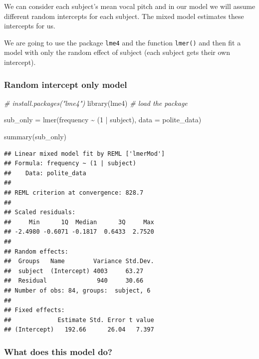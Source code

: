 \documentclass[
  openany]{book}
\newenvironment{Shaded}{\begin{snugshade}}{\end{snugshade}}
\newcommand{\AttributeTok}[1]{\textcolor[rgb]{0.77,0.63,0.00}{#1}}
\newcommand{\CommentTok}[1]{\textcolor[rgb]{0.56,0.35,0.01}{\textit{#1}}}
\newcommand{\DecValTok}[1]{\textcolor[rgb]{0.00,0.00,0.81}{#1}}
\newcommand{\FunctionTok}[1]{\textcolor[rgb]{0.00,0.00,0.00}{#1}}
\newcommand{\NormalTok}[1]{#1}
\newcommand{\OtherTok}[1]{\textcolor[rgb]{0.56,0.35,0.01}{#1}}
\newcommand{\SpecialCharTok}[1]{\textcolor[rgb]{0.00,0.00,0.00}{#1}}
\begin{document}
We can consider each subject's mean vocal pitch and in our model we will assume different random intercepts for each subject. The mixed model estimates these intercepts for us.

We are going to use the package \texttt{lme4} and the function \texttt{lmer()} and then fit a model with only the random effect of subject (each subject gets their own intercept).

\hypertarget{random-intercept-only-model}{%
\subsubsection{Random intercept only model}\label{random-intercept-only-model}}

\begin{Shaded}
\begin{Highlighting}[]
\CommentTok{\# install.packages("lme4")}
\FunctionTok{library}\NormalTok{(lme4) }\CommentTok{\# load the package}

\NormalTok{sub\_only }\OtherTok{=} \FunctionTok{lmer}\NormalTok{(frequency }\SpecialCharTok{\textasciitilde{}}\NormalTok{ (}\DecValTok{1} \SpecialCharTok{|}\NormalTok{ subject),  }\AttributeTok{data =}\NormalTok{ polite\_data)}
\end{Highlighting}
\end{Shaded}

\begin{Shaded}
\begin{Highlighting}[]
\FunctionTok{summary}\NormalTok{(sub\_only)}
\end{Highlighting}
\end{Shaded}

\begin{verbatim}
## Linear mixed model fit by REML ['lmerMod']
## Formula: frequency ~ (1 | subject)
##    Data: polite_data
## 
## REML criterion at convergence: 828.7
## 
## Scaled residuals: 
##     Min      1Q  Median      3Q     Max 
## -2.4980 -0.6071 -0.1817  0.6433  2.7520 
## 
## Random effects:
##  Groups   Name        Variance Std.Dev.
##  subject  (Intercept) 4003     63.27   
##  Residual              940     30.66   
## Number of obs: 84, groups:  subject, 6
## 
## Fixed effects:
##             Estimate Std. Error t value
## (Intercept)   192.66      26.04   7.397
\end{verbatim}

\hypertarget{what-does-this-model-do}{%
\subsubsection{What does this model do?}\label{what-does-this-model-do}}
\end{document}
